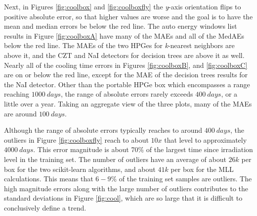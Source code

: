 Next, in Figures \ref{fig:coolbox} and \ref{fig:coolboxfly} the \textit{y}-axis
orientation flips to positive absolute error, so that higher values are worse
and the goal is to have the mean and median errors be below the red line.  The
auto energy windows list results in Figure \ref{fig:coolboxA} have many of the
\gls{MAE}s and all of the \gls{MedAE}s below the red line.  The \gls{MAE}s of
the two \gls{HPGe}s for \textit{k}-nearest neighbors are above it, and the
\gls{CZT} and \gls{NaI} detectors for decision trees are above it as well.
Nearly all of the cooling time errors in Figures \ref{fig:coolboxB}, and
\ref{fig:coolboxC} are on or below the red line, except for the \gls{MAE} of
the decision trees results for the \gls{NaI} detector.  Other than the portable
\gls{HPGe} box which encompasses a range reaching $1000\:days$, the range of
absolute errors rarely exceeds $400\:days$, or a little over a year.  Taking an
aggregate view of the three plots, many of the \gls{MAE}s are around
$100\:days$.

Although the range of absolute errors typically reaches to around $400\:days$,
the outliers in Figure \ref{fig:coolboxfly} reach to about $10x$ that level to
approximately $4000\:days$. This error magnitude is about 70\% of the largest
time since irradiation level in the training set.  The number of outliers have
an average of about $26k$ per box for the two scikit-learn algorithms, and
about $41k$ per box for the \gls{MLL} calculations.  This means that $6-9\%$ of
the training set samples are outliers.  The high magnitude errors along with
the large number of outliers contributes to the standard deviations in Figure
\ref{fig:cool}, which are so large that it is difficult to conclusively define
a trend.

